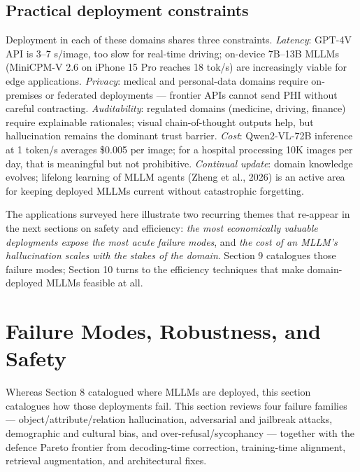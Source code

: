 \subsection{Practical deployment constraints}\label{practical-deployment-constraints}

Deployment in each of these domains shares three constraints. \emph{Latency}: GPT-4V API is 3--7 s/image, too slow for real-time driving; on-device 7B--13B MLLMs (MiniCPM-V 2.6 on iPhone 15 Pro reaches 18 tok/s) are increasingly viable for edge applications. \emph{Privacy}: medical and personal-data domains require on-premises or federated deployments --- frontier APIs cannot send PHI without careful contracting. \emph{Auditability}: regulated domains (medicine, driving, finance) require explainable rationales; visual chain-of-thought outputs help, but hallucination remains the dominant trust barrier. \emph{Cost}: Qwen2-VL-72B inference at 1 token/s averages \$0.005 per image; for a hospital processing 10K images per day, that is meaningful but not prohibitive. \emph{Continual update}: domain knowledge evolves; lifelong learning of MLLM agents (Zheng et al., 2026) is an active area for keeping deployed MLLMs current without catastrophic forgetting.

The applications surveyed here illustrate two recurring themes that re-appear in the next sections on safety and efficiency: \emph{the most economically valuable deployments expose the most acute failure modes}, and \emph{the cost of an MLLM's hallucination scales with the stakes of the domain}. Section 9 catalogues those failure modes; Section 10 turns to the efficiency techniques that make domain-deployed MLLMs feasible at all.

\section{Failure Modes, Robustness, and Safety}\label{failure-modes-robustness-and-safety}

Whereas Section 8 catalogued where MLLMs are deployed, this section catalogues how those deployments fail. This section reviews four failure families --- object/attribute/relation hallucination, adversarial and jailbreak attacks, demographic and cultural bias, and over-refusal/sycophancy --- together with the defence Pareto frontier from decoding-time correction, training-time alignment, retrieval augmentation, and architectural fixes.

